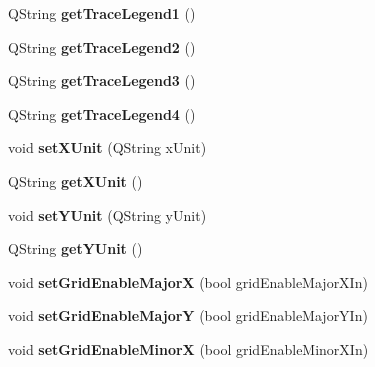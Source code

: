 \begin{DoxyCompactItemize}
\item 
\hypertarget{classQEPlot_a27299689e750f8782d383995fe2aed43}{
QString {\bfseries getTraceLegend1} ()}
\label{classQEPlot_a27299689e750f8782d383995fe2aed43}

\item 
\hypertarget{classQEPlot_a6caa209e722cc68286cc198c93c4a396}{
QString {\bfseries getTraceLegend2} ()}
\label{classQEPlot_a6caa209e722cc68286cc198c93c4a396}

\item 
\hypertarget{classQEPlot_abc12ff1cbb7ed4d0cfcff569e541b1bf}{
QString {\bfseries getTraceLegend3} ()}
\label{classQEPlot_abc12ff1cbb7ed4d0cfcff569e541b1bf}

\item 
\hypertarget{classQEPlot_a428dcac7deeae78846619e57bf540ba8}{
QString {\bfseries getTraceLegend4} ()}
\label{classQEPlot_a428dcac7deeae78846619e57bf540ba8}

\item 
\hypertarget{classQEPlot_a02bae9f766d08f3107dbf59549435131}{
void {\bfseries setXUnit} (QString xUnit)}
\label{classQEPlot_a02bae9f766d08f3107dbf59549435131}

\item 
\hypertarget{classQEPlot_ada165d1d111c2aef82996656c573de27}{
QString {\bfseries getXUnit} ()}
\label{classQEPlot_ada165d1d111c2aef82996656c573de27}

\item 
\hypertarget{classQEPlot_ada132c8efc2799df044d8af313d195da}{
void {\bfseries setYUnit} (QString yUnit)}
\label{classQEPlot_ada132c8efc2799df044d8af313d195da}

\item 
\hypertarget{classQEPlot_a91a2eb91b61c2b6ea45d061655a1f0d7}{
QString {\bfseries getYUnit} ()}
\label{classQEPlot_a91a2eb91b61c2b6ea45d061655a1f0d7}

\item 
\hypertarget{classQEPlot_a6ab0d8a132baa89747fa514d1f7e84f6}{
void {\bfseries setGridEnableMajorX} (bool gridEnableMajorXIn)}
\label{classQEPlot_a6ab0d8a132baa89747fa514d1f7e84f6}

\item 
\hypertarget{classQEPlot_aa4583b431a59efc7d80bfb574ab4146d}{
void {\bfseries setGridEnableMajorY} (bool gridEnableMajorYIn)}
\label{classQEPlot_aa4583b431a59efc7d80bfb574ab4146d}

\item 
\hypertarget{classQEPlot_a228fac3d1fdd5d70a4f1644e6a90805c}{
void {\bfseries setGridEnableMinorX} (bool gridEnableMinorXIn)}
\label{classQEPlot_a228fac3d1fdd5d70a4f1644e6a90805c}


\end{DoxyCompactItemize}
